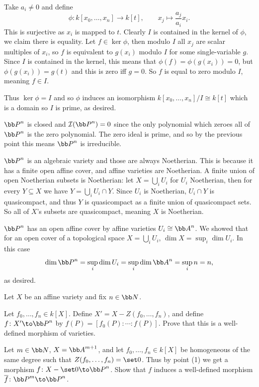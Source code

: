         Take $a_i\neq0$ and define
        $$ \phi\colon k[x_0,\dots,x_n] \to k[t],\qquad x_j \mapsto \frac{a_j}{a_i}x_i . $$
        This is surjective as $x_i$ is mapped to $t$.
        Clearly $I$ is contained in the kernel of $\phi$, we claim there is equality.
        Let $f\in\ker\phi$, then modulo $I$ all $x_j$ are scalar multiples of $x_i$, so $f$ is equivalent to $g(x_i)$ modulo $I$ for some
        single-variable $g$.
        Since $I$ is contained in the kernel, this means that $\phi(f)=\phi(g(x_i))=0$, but $\phi(g(x_i))=g(t)$ and this is zero iff
        $g=0$.
        So $f$ is equal to zero modulo $I$, meaning $f\in I$.

        Thus $\ker\phi=I$ and so $\phi$ induces an isomorphism $k[x_0,\dots,x_n]/I\cong k[t]$ which is a domain so $I$ is prime, as desired.
    \eenum

    \item $\bP^n$ is closed and $\I(\bP^n)=0$ since the only polynomial which zeroes all of $\bP^n$ is the zero polynomial.
    The zero ideal is prime, and so by the previous point this means $\bP^n$ is irreducible.

    \item $\bP^n$ is an algebraic variety and those are always Noetherian.
    This is because it has a finite open affine cover, and affine varieties are Noetherian.
    A finite union of open Noetherian subsets is Noetherian: let $X=\bigcup_iU_i$ for $U_i$ Noetherian, then for every $Y\subseteq X$ we have $Y=\bigcup_iU_i\cap Y$.
    Since $U_i$ is Noetherian, $U_i\cap Y$ is quasicompact, and thus $Y$ is quasicompact as a finite union of quasicompact sets.
    So all of $X$'s subsets are quasicompact, meaning $X$ is Noetherian.

    $\bP^n$ has an open affine cover by affine varieties $U_i\cong\bA^n$.
    We showed that for an open cover of a topological space $X=\bigcup_iU_i$, $\dim X=\sup_i\dim U_i$.
    In this case
    $$ \dim\bP^n = \sup_i\dim U_i = \sup_i\dim\bA^n = \sup_in = n , $$
    as desired.
\eenum

\bprob

    Let $X$ be an affine variety and fix $n\in\bN$.
    \benum
        \item Let $f_0,\dots,f_n\in k[X]$.
        Define $X'=X-Z(f_0,\dots,f_n)$, and define $f\colon X'\to\bP^n$ by $f(P)=[f_0(P):\cdots:f(P)]$.
        Prove that this is a well-defined morphism of varieties.

        \item Let $m\in\bN$, $X=\bA^{m+1}$, and let $f_0,\dots,f_n\in k[X]$ be homogeneous of the same degree such that $Z(f_0,\dots,f_n)=\set0$.
        Thus by point (1) we get a morphism $f\colon X-\set0\to\bP^n$.
        Show that $f$ induces a well-defined morphism $\bar f\colon\bP^m\to\bP^n$.
    \eenum

